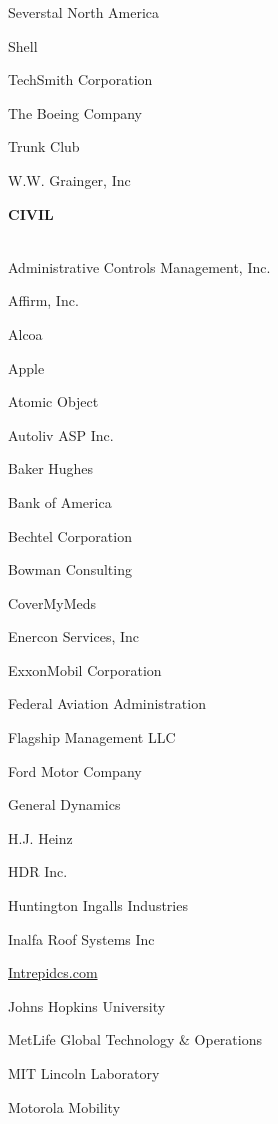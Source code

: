 \documentclass[twoside]{article}
\begin{document}
\begin{center}
\begin{multicols}{5}
\begin{FlushLeft}
\begin{compactitem}
\item Severstal North America
\item Shell
\item TechSmith Corporation
\item The Boeing Company
\item Trunk Club
\item W.W. Grainger, Inc
\end{compactitem}
        \end{FlushLeft}
        \vspace{1em}
        {\fontsize{14}{16}\selectfont \bf CIVIL}\\
        \vspace{-1em}
        ~\hrulefill~
        \vspace{-.9em}
        \begin{FlushLeft}
        \begin{compactitem}
        \item Administrative Controls Management, Inc.
\item Affirm, Inc.
\item Alcoa
\item Apple
\item Atomic Object
\item Autoliv ASP Inc.
\item Baker Hughes
\item Bank of America
\item Bechtel Corporation
\item Bowman Consulting
\item CoverMyMeds
\item Enercon Services, Inc
\item ExxonMobil Corporation
\item Federal Aviation Administration
\item Flagship Management LLC
\item Ford Motor Company
\item General Dynamics
\item H.J. Heinz
\item HDR Inc.
\item Huntington Ingalls Industries
\item Inalfa Roof Systems Inc
\item \url{Intrepidcs.com}
\item Johns Hopkins University
\item MetLife Global Technology \& Operations
\item MIT Lincoln Laboratory
\item Motorola Mobility

\end{compactitem}
\end{FlushLeft}
\end{multicols}
\end{center}
\end{document}
